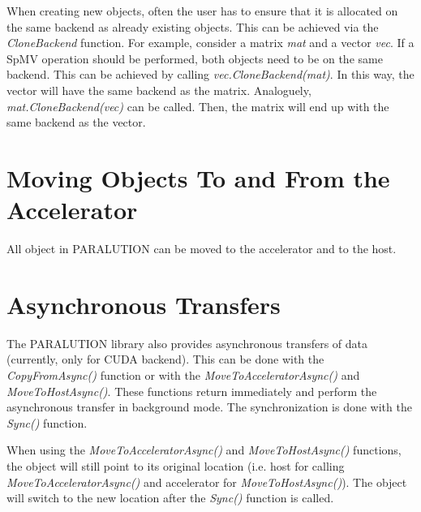 When creating new objects, often the user has to ensure that it is allocated on the same backend as already existing objects. This can be achieved via the \emph{CloneBackend} function. For example, consider a matrix \emph{mat} and a vector \emph{vec}. If a SpMV operation should be performed, both objects need to be on the same backend. This can be achieved by calling \emph{vec.CloneBackend(mat)}. In this way, the vector will have the same backend as the matrix. Analoguely, \emph{mat.CloneBackend(vec)} can be called. Then, the matrix will end up with the same backend as the vector.

\section{Moving Objects To and From the Accelerator}

All object in PARALUTION can be moved to the accelerator and to the host.







\section{Asynchronous Transfers}

The PARALUTION library also provides asynchronous transfers of data (currently, only for CUDA backend). This can be done with the \emph{CopyFromAsync()} function or with the \emph{MoveToAcceleratorAsync()} and \emph{MoveToHostAsync()}. These functions return immediately and perform the asynchronous transfer in background mode. The synchronization is done with the \emph{Sync()} function.





When using the \emph{MoveToAcceleratorAsync()} and \emph{MoveToHostAsync()} functions, the object will still point to its original location (i.e. host for calling \emph{MoveToAcceleratorAsync()} and accelerator for \emph{MoveToHostAsync()}). The object will switch to the new location after the \emph{Sync()} function is called.

